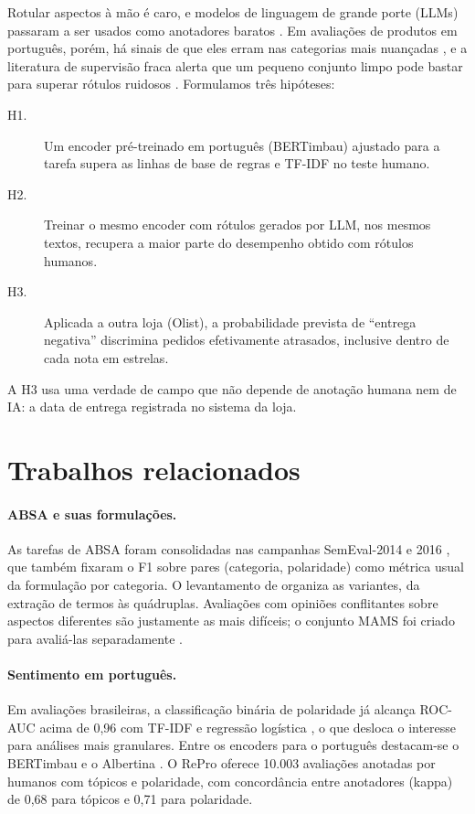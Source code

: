 \documentclass[a4paper, twocolumn, 11pt, twoside]{article}
\begin{document}
Rotular aspectos à mão é caro, e modelos de linguagem de grande porte (LLMs) passaram a ser usados como anotadores baratos \citep{gilardi2023chatgpt,wang2021labeling}. Em avaliações de produtos em português, porém, há sinais de que eles erram nas categorias mais nuançadas \citep{silva2024sabia}, e a literatura de supervisão fraca alerta que um pequeno conjunto limpo pode bastar para superar rótulos ruidosos \citep{zhu2023weaker}. Formulamos três hipóteses:

\begin{description}
  \item[H1.] Um encoder pré-treinado em português (BERTimbau) ajustado para a tarefa supera as linhas de base de regras e TF-IDF no teste humano.
  \item[H2.] Treinar o mesmo encoder com rótulos gerados por LLM, nos mesmos textos, recupera a maior parte do desempenho obtido com rótulos humanos.
  \item[H3.] Aplicada a outra loja (Olist), a probabilidade prevista de ``entrega negativa'' discrimina pedidos efetivamente atrasados, inclusive dentro de cada nota em estrelas.
\end{description}

A H3 usa uma verdade de campo que não depende de anotação humana nem de IA: a data de entrega registrada no sistema da loja.

\section{Trabalhos relacionados}

\paragraph{ABSA e suas formulações.} As tarefas de ABSA foram consolidadas nas campanhas SemEval-2014 e 2016 \citep{pontiki2014semeval,pontiki2016semeval}, que também fixaram o F1 sobre pares (categoria, polaridade) como métrica usual da formulação por categoria. O levantamento de \citet{zhang2023survey} organiza as variantes, da extração de termos às quádruplas. Avaliações com opiniões conflitantes sobre aspectos diferentes são justamente as mais difíceis; o conjunto MAMS foi criado para avaliá-las separadamente \citep{jiang2019mams}.

\paragraph{Sentimento em português.} Em avaliações brasileiras, a classificação binária de polaridade já alcança ROC-AUC acima de 0,96 com TF-IDF e regressão logística \citep{souza2021reviews}, o que desloca o interesse para análises mais granulares. Entre os encoders para o português destacam-se o BERTimbau \citep{souza2020bertimbau} e o Albertina \citep{rodrigues2023albertina}. O RePro \citep{silva2024repro} oferece 10.003 avaliações anotadas por humanos com tópicos e polaridade, com concordância entre anotadores (kappa) de 0,68 para tópicos e 0,71 para polaridade.
\end{document}
